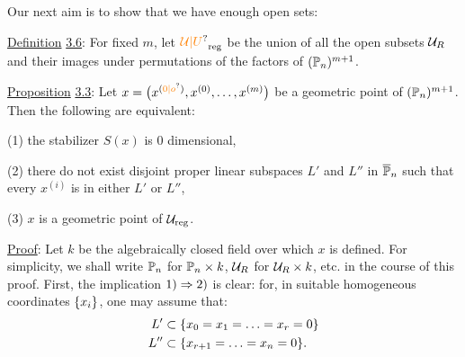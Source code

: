 Our next aim is to show that we have enough open sets:

\uline{Definition} \uline{3.6}: For fixed $m$, let $\handwritten{\unsure{\mathcal U|U}}_{\mathrm{reg}}$ be the union of all the open subsets $\mathcal U_R$ and their images under permutations of the factors of $(\mathbb P_n)^{m+1}$.

\uline{Proposition} \uline{3.3}: Let $x=\handwritten{\bigl(}x^{(\unsure{0|o})},x^{(0)},\ldots,x^{(m)}\handwritten{\bigr)}$ be a geometric point of $(\mathbb P_n)^{m+1}$. Then the following are equivalent:

(1) the stabilizer $S(x)$ is 0 dimensional,

(2) there do not exist disjoint proper linear subspaces $L'$ and $L''$ in $\overline{\mathbb P}_n$ such that every $x^{(i)}$ is in either $L'$ or $L''$,

(3) $x$ is a geometric point of $\mathcal U_{\mathrm{reg}}$.

\uline{Proof}: Let $k$ be the algebraically closed field over which $x$ is defined. For simplicity, we shall write $\mathbb P_n$ for $\mathbb P_n\times k$, $\mathcal U_R$ for $\mathcal U_R\times k$, etc. in the course of this proof. First, the implication $1)\Rightarrow2)$ is clear: for, in suitable homogeneous coordinates $\{x_i\}$, one may assume that:
\[
\begin{aligned}
L' &\subset\{x_0=x_1=\ldots=x_r=0\}\\
L'' &\subset\{x_{r+1}=\ldots=x_n=0\}.
\end{aligned}
\]

